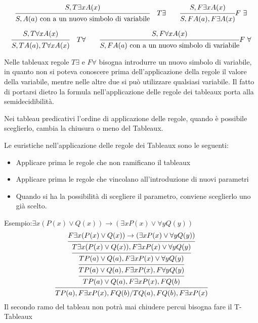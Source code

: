 \begin{equation*}
\begin{prooftree}%
\hypo{S,T \exists x A(x)}
\infer1 {S,A(a) \ \text{con a un nuovo simbolo di variabile}}
\end{prooftree}
\quad T \exists \qquad
\begin{prooftree} %
\hypo{S,F \exists x A(x)}
\infer1 {S,F A(a),F \exists A(x)}
\end{prooftree}
F \ \exists
\end{equation*}

\begin{equation*}
\begin{prooftree}%
\hypo{S,T \forall x A(x)}
\infer1 {S,T A(a),T \forall x A(x)}
\end{prooftree}
\quad T \forall \qquad
\begin{prooftree}%
\hypo{S,F \forall x A(x)}
\infer1 {S,F A(a) \ \text{con a un nuovo simbolo di variabile}}
\end{prooftree}
F \ \forall
\end{equation*}

Nelle tableuax regole $T \exists$ e $F \forall$ bisogna introdurre un nuovo simbolo di
variabile, in quanto non si poteva conoscere prima dell'applicazione della regole
il valore della variabile, mentre nelle altre due si può utilizzare qualsiasi variabile.
Il fatto di portarsi dietro la formula nell'applicazione delle regole dei tableaux
porta alla semidecidibilità.

Nei tableau predicativi l'ordine di applicazione delle regole, quando è possibile
sceglierlo, cambia la chiusura o meno del Tableaux.

Le euristiche nell'applicazione delle regole dei Tableaux sono le seguenti:
\begin{itemize}
    \item Applicare prima le regole che non ramificano il tableaux
    \item Applicare prima le regole che vincolano all'introduzione di nuovi parametri
    \item Quando si ha la possibilità di scegliere il parametro, conviene sceglierlo uno già scelto.
\end{itemize}

Esempio:$\exists x (P(x) \lor Q(x)) \rightarrow (\exists x P(x) \lor \forall y Q(y))$
\begin{equation*}
\begin{prooftree}
\hypo{F \exists x (P(x) \lor Q(x)) \rightarrow (\exists x P(x) \lor \forall y Q(y))}
\infer1 {T \exists x (P(x) \lor Q(x)), F \exists x P(x) \lor \forall y Q(y)}
\infer1{T P(a) \lor Q(a), F \exists x P(x) \lor \forall y Q(y)}
\infer1 {T P(a) \lor Q(a), F \exists x P(x), F \forall y Q(y)}
\infer1 {T P(a) \lor Q(a), F \exists x P(x), F Q(b)}
\infer1 {T P(a),F \exists x P(x),F Q(b)/T Q(a),F Q(b),F \exists x P(x)}
\end{prooftree}
\end{equation*}
Il secondo ramo del tableau non potrà mai chiudere percui bisogna fare il T-Tableaux

